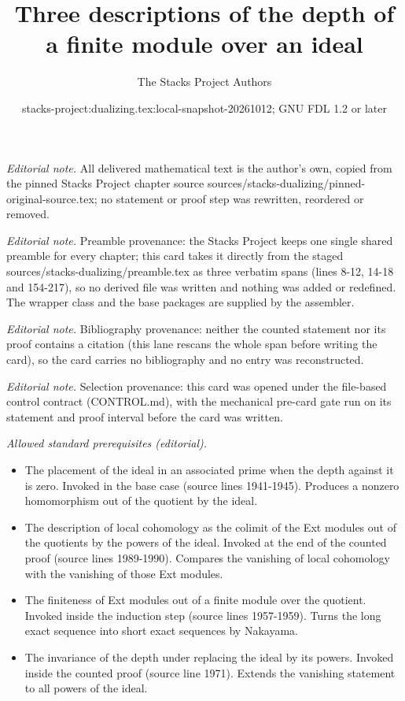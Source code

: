 \documentclass[10pt,a4paper]{amsart}
\title{Three descriptions of the depth of a finite module over an ideal}
\author{The Stacks Project Authors}
\date{stacks-project:dualizing.tex:local-snapshot-20261012; GNU FDL 1.2 or later}
\theoremstyle{plain}
\theoremstyle{definition}
\theoremstyle{remark}
\numberwithin{equation}{subsection}
\begin{document}
\maketitle
\noindent\textit{Editorial note.} All delivered mathematical text is the author's own, copied from the pinned Stacks Project chapter source sources/stacks-dualizing/pinned-original-source.tex; no statement or proof step was rewritten, reordered or removed.\par\medskip
\noindent\textit{Editorial note.} Preamble provenance: the Stacks Project keeps one single shared preamble for every chapter; this card takes it directly from the staged sources/stacks-dualizing/preamble.tex as three verbatim spans (lines 8-12, 14-18 and 154-217), so no derived file was written and nothing was added or redefined. The wrapper class and the base packages are supplied by the assembler.\par\medskip
\noindent\textit{Editorial note.} Bibliography provenance: neither the counted statement nor its proof contains a citation (this lane rescans the whole span before writing the card), so the card carries no bibliography and no entry was reconstructed.\par\medskip
\noindent\textit{Editorial note.} Selection provenance: this card was opened under the file-based control contract (CONTROL.md), with the mechanical pre-card gate run on its statement and proof interval before the card was written.\par\medskip
\noindent\textit{Allowed standard prerequisites (editorial).}\begin{itemize}
\item The placement of the ideal in an associated prime when the depth against it is zero. Invoked in the base case (source lines 1941-1945). Produces a nonzero homomorphism out of the quotient by the ideal.
\item The description of local cohomology as the colimit of the Ext modules out of the quotients by the powers of the ideal. Invoked at the end of the counted proof (source lines 1989-1990). Compares the vanishing of local cohomology with the vanishing of those Ext modules.
\item The finiteness of Ext modules out of a finite module over the quotient. Invoked inside the induction step (source lines 1957-1959). Turns the long exact sequence into short exact sequences by Nakayama.
\item The invariance of the depth under replacing the ideal by its powers. Invoked inside the counted proof (source line 1971). Extends the vanishing statement to all powers of the ideal.
\end{itemize}\medskip
\end{document}
